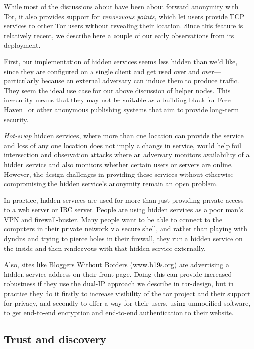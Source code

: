 \documentclass{llncs}
\begin{document}
While most of the discussions about have been about forward anonymity
with Tor, it also provides support for \emph{rendezvous points}, which
let users provide TCP services to other Tor users without revealing
their location. Since this feature is relatively recent, we describe here
a couple of our early observations from its deployment.

First, our implementation of hidden services seems less hidden than we'd
like, since they are configured on a single client and get used over
and over---particularly because an external adversary can induce them to
produce traffic. They seem the ideal use case for our above discussion
of helper nodes. This insecurity means that they may not be suitable as
a building block for Free Haven~\cite{freehaven-berk} or other anonymous
publishing systems that aim to provide long-term security.

\emph{Hot-swap} hidden services, where more than one location can
provide the service and loss of any one location does not imply a
change in service, would help foil intersection and observation attacks
where an adversary monitors availability of a hidden service and also
monitors whether certain users or servers are online. However, the design
challenges in providing these services without otherwise compromising
the hidden service's anonymity remain an open problem.

In practice, hidden services are used for more than just providing private
access to a web server or IRC server. People are using hidden services
as a poor man's VPN and firewall-buster. Many people want to be able
to connect to the computers in their private network via secure shell,
and rather than playing with dyndns and trying to pierce holes in their
firewall, they run a hidden service on the inside and then rendezvous
with that hidden service externally.

Also, sites like Bloggers Without Borders (www.b19s.org) are advertising
a hidden-service address on their front page. Doing this can provide
increased robustness if they use the dual-IP approach we describe in
tor-design, but in practice they do it firstly to increase visibility
of the tor project and their support for privacy, and secondly to offer
a way for their users, using unmodified software, to get end-to-end
encryption and end-to-end authentication to their website.

\subsection{Trust and discovery}
\label{subsec:trust-and-discovery}
\end{document}
